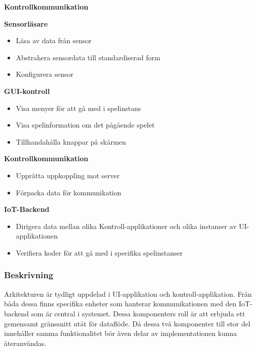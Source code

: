 \begin{labeling}{\small{\textbf{Kontrollkommunikation}}}
    \item [\small{\textbf{Sensorläsare}}]
        \begin{itemize}
            \item Läsa av data från sensor
            \item Abstrahera sensordata till standardiserad form
            \item Konfigurera sensor
            \newline
        \end{itemize}

    \item [\small{\textbf{GUI-kontroll}}]
        \begin{itemize}
            \item Visa menyer för att gå med i spelinstans
            \item Visa spelinformation om det pågående spelet
            \item Tillhandahålla knappar på skärmen
            \newline
        \end{itemize}

    \item [\small{\textbf{Kontrollkommunikation}}]
        \begin{itemize}
            \item Upprätta uppkoppling mot server
            \item Förpacka data för kommunikation
            \newline
        \end{itemize}

    \item [\small{\textbf{IoT-Backend}}]
        \begin{itemize}
            \item Dirigera data mellan olika Kontroll-applikationer och olika instanser av UI-applikationen
            \item Verifiera koder för att gå med i specifika spelinstanser
            \newline
        \end{itemize}
\end{labeling}

\subsubsection{Beskrivning}
Arkitekturen är tydligt uppdelad i UI-applikation och kontroll-applikation. Från båda dessa finns specifika enheter som hanterar kommunikationen med den IoT-backend som är central i systemet. Dessa komponenters roll är att erbjuda ett gemensamt gränssnitt utåt för dataflöde. Då dessa två komponenter till stor del innehåller samma funktionalitet bör även delar av implementationen kunna återanvändas.\\

